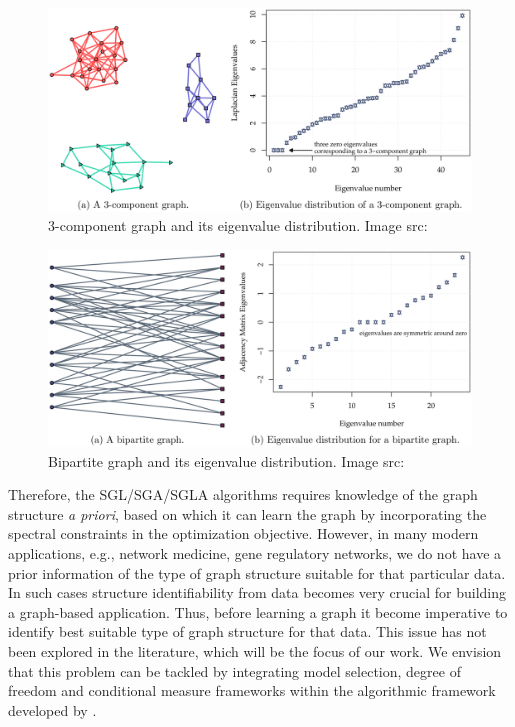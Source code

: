 \begin{center}
	\begin{figure}[htpb]
		\includegraphics[scale=0.3]{Pictures/kcomp.eps}
		\caption{3-component graph and its eigenvalue distribution. Image src: \cite{kumar2020unified}  }
		\label{fig:kcomp-eig}
	\end{figure}
\end{center}

\begin{center}
	\begin{figure}[htpb]
		\includegraphics[scale=0.3]{Pictures/bipartite.eps}
		\caption{Bipartite graph and its eigenvalue distribution. Image src: \cite{kumar2020unified}  }
		\label{fig:bipartite-eig}
	\end{figure}
\end{center}

Therefore, the SGL/SGA/SGLA algorithms requires knowledge of the graph structure \textit{a priori}, based on which it can learn the graph by incorporating the spectral constraints in the optimization objective. However, in many modern applications, e.g., network medicine, gene regulatory networks, we do not have a prior information of the type of graph structure suitable for that particular data. In such cases structure identifiability from data becomes very crucial for building a graph-based application. Thus, before learning a graph it become imperative to identify best suitable type of graph structure for that data. This issue has not been explored in the literature, which will be the focus of our work.  We envision that this problem can be tackled by integrating model selection, degree of freedom and conditional measure frameworks  within the algorithmic framework developed by \cite{kumar2020unified}.

